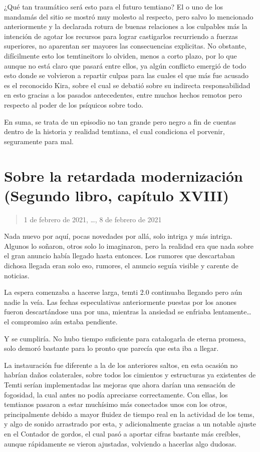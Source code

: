 \documentclass[
]{book}
\begin{document}
¿Qué tan traumático será esto para el futuro temtiano? El o uno de los mandamás del sitio se mostró muy molesto al respecto, pero salvo lo mencionado anteriormente y la declarada rotura de buenas relaciones a los culpables más la intención de agotar los recursos para lograr castigarlos recurriendo a fuerzas superiores, no aparentan ser mayores las consecuencias explicitas. No obstante, difícilmente esto los temtineitors lo olviden, menos a corto plazo, por lo que aunque no está claro que pasará entre ellos, ya algún conflicto emergió de todo esto donde se volvieron a repartir culpas para las cuales el que más fue acusado es el reconocido Kira, sobre el cual se debatió sobre su indirecta responsabilidad en esto gracias a los pasados antecedentes, entre muchos hechos remotos pero respecto al poder de los psíquicos sobre todo.

En suma, se trata de un episodio no tan grande pero negro a fin de cuentas dentro de la historia y realidad temtiana, el cual condiciona el porvenir, seguramente para mal.

\hypertarget{sobre-la-retardada-modernizaciuxf3n-segundo-libro-capuxedtulo-xviii}{%
\section{Sobre la retardada modernización (Segundo libro, capítulo XVIII)}\label{sobre-la-retardada-modernizaciuxf3n-segundo-libro-capuxedtulo-xviii}}

\begin{quote}
1 de febrero de 2021, \ldots, 8 de febrero de 2021
\end{quote}

Nada nuevo por aquí, pocas novedades por allá, solo intriga y más intriga. Algunos lo soñaron, otros solo lo imaginaron, pero la realidad era que nada sobre el gran anuncio había llegado hasta entonces. Los rumores que descartaban dichosa llegada eran solo eso, rumores, el anuncio seguía visible y carente de noticias.

La espera comenzaba a hacerse larga, temti 2.0 continuaba llegando pero aún nadie la veía. Las fechas especulativas anteriormente puestas por los anones fueron descartándose una por una, mientras la ansiedad se enfriaba lentamente\ldots{} el compromiso aún estaba pendiente.

Y se cumpliría. No hubo tiempo suficiente para catalogarla de eterna promesa, solo demoró bastante para lo pronto que parecía que esta iba a llegar.

La instauración fue diferente a la de los anteriores saltos, en esta ocasión no habrían daños colaterales, sobre todos los cimientos y estructuras ya existentes de Temti serían implementadas las mejoras que ahora darían una sensación de fogosidad, la cual antes no podía apreciarse correctamente. Con ellas, los temtianos pasaron a estar muchísimo más conectados unos con los otros, principalmente debido a mayor fluidez de tiempo real en la actividad de los tems, y algo de sonido arrastrado por esta, y adicionalmente gracias a un notable ajuste en el Contador de gordos, el cual pasó a aportar cifras bastante más creíbles, aunque rápidamente se vieron ajustadas, volviendo a hacerlas algo dudosas.
\end{document}
